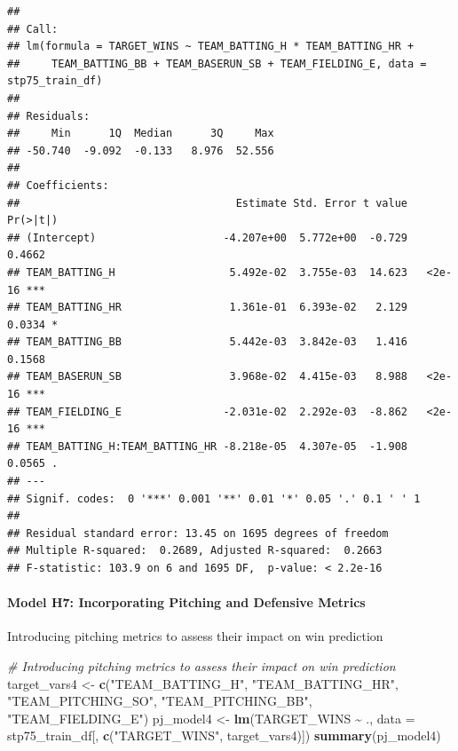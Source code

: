\documentclass[
]{article}
\newenvironment{Shaded}{\begin{snugshade}}{\end{snugshade}}
\newcommand{\AttributeTok}[1]{\textcolor[rgb]{0.13,0.29,0.53}{#1}}
\newcommand{\CommentTok}[1]{\textcolor[rgb]{0.56,0.35,0.01}{\textit{#1}}}
\newcommand{\FunctionTok}[1]{\textcolor[rgb]{0.13,0.29,0.53}{\textbf{#1}}}
\newcommand{\NormalTok}[1]{#1}
\newcommand{\OtherTok}[1]{\textcolor[rgb]{0.56,0.35,0.01}{#1}}
\newcommand{\SpecialCharTok}[1]{\textcolor[rgb]{0.81,0.36,0.00}{\textbf{#1}}}
\newcommand{\StringTok}[1]{\textcolor[rgb]{0.31,0.60,0.02}{#1}}
\begin{document}
\begin{verbatim}
## 
## Call:
## lm(formula = TARGET_WINS ~ TEAM_BATTING_H * TEAM_BATTING_HR + 
##     TEAM_BATTING_BB + TEAM_BASERUN_SB + TEAM_FIELDING_E, data = stp75_train_df)
## 
## Residuals:
##     Min      1Q  Median      3Q     Max 
## -50.740  -9.092  -0.133   8.976  52.556 
## 
## Coefficients:
##                                  Estimate Std. Error t value Pr(>|t|)    
## (Intercept)                    -4.207e+00  5.772e+00  -0.729   0.4662    
## TEAM_BATTING_H                  5.492e-02  3.755e-03  14.623   <2e-16 ***
## TEAM_BATTING_HR                 1.361e-01  6.393e-02   2.129   0.0334 *  
## TEAM_BATTING_BB                 5.442e-03  3.842e-03   1.416   0.1568    
## TEAM_BASERUN_SB                 3.968e-02  4.415e-03   8.988   <2e-16 ***
## TEAM_FIELDING_E                -2.031e-02  2.292e-03  -8.862   <2e-16 ***
## TEAM_BATTING_H:TEAM_BATTING_HR -8.218e-05  4.307e-05  -1.908   0.0565 .  
## ---
## Signif. codes:  0 '***' 0.001 '**' 0.01 '*' 0.05 '.' 0.1 ' ' 1
## 
## Residual standard error: 13.45 on 1695 degrees of freedom
## Multiple R-squared:  0.2689, Adjusted R-squared:  0.2663 
## F-statistic: 103.9 on 6 and 1695 DF,  p-value: < 2.2e-16
\end{verbatim}

\paragraph{Model H7: Incorporating Pitching and Defensive
Metrics}\label{model-h7-incorporating-pitching-and-defensive-metrics}

Introducing pitching metrics to assess their impact on win prediction

\begin{Shaded}
\begin{Highlighting}[]
\CommentTok{\# Introducing pitching metrics to assess their impact on win prediction}
\NormalTok{target\_vars4 }\OtherTok{\textless{}{-}} \FunctionTok{c}\NormalTok{(}\StringTok{"TEAM\_BATTING\_H"}\NormalTok{, }\StringTok{"TEAM\_BATTING\_HR"}\NormalTok{, }\StringTok{"TEAM\_PITCHING\_SO"}\NormalTok{, }\StringTok{"TEAM\_PITCHING\_BB"}\NormalTok{, }\StringTok{"TEAM\_FIELDING\_E"}\NormalTok{)}
\NormalTok{pj\_model4 }\OtherTok{\textless{}{-}} \FunctionTok{lm}\NormalTok{(TARGET\_WINS }\SpecialCharTok{\textasciitilde{}}\NormalTok{ ., }\AttributeTok{data =}\NormalTok{ stp75\_train\_df[, }\FunctionTok{c}\NormalTok{(}\StringTok{"TARGET\_WINS"}\NormalTok{, target\_vars4)])}
\FunctionTok{summary}\NormalTok{(pj\_model4)}
\end{Highlighting}
\end{Shaded}
\end{document}
